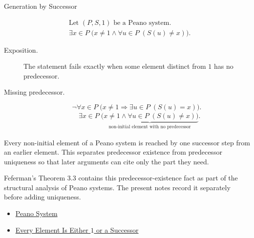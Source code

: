 \begin{topicbox}{Generation by Successor}
\begin{remark*}
\[
\begin{aligned}
&\text{Let } (P,S,1) \text{ be a Peano system.}\\
&\exists x \in P\;\bigl(x\neq 1 \land
\forall u \in P\;(S(u)\neq x)\bigr).
\end{aligned}
\]
\end{remark*}

\begin{remark*}
\begin{description}
  \item[Exposition.]
  The statement fails exactly when some element distinct from $1$ has no
  predecessor.
  \item[Missing predecessor.]
  \[
  \neg\forall x \in P\;\bigl(x\neq 1 \Longrightarrow
  \exists u \in P\;(S(u)=x)\bigr).
  \]
  \[
  \begin{aligned}
  &\exists x \in P\;
  \underbrace{\bigl(x\neq 1 \land
  \forall u \in P\;(S(u)\neq x)\bigr)}_{\text{non-initial element with no predecessor}}.
  \end{aligned}
  \]
\end{description}
\end{remark*}

\begin{remark*}[Interpretation]
Every non-initial element of a Peano system is reached by one successor step
from an earlier element. This separates predecessor existence from predecessor
uniqueness so that later arguments can cite only the part they need.
\end{remark*}

\begin{remark*}
Feferman's Theorem 3.3 contains this predecessor-existence fact as part of the
structural analysis of Peano systems. The present notes record it separately
before adding uniqueness. \citet{FefermanNumberSystems1964}
\end{remark*}

\begin{dependencies}
\begin{itemize}
  \item \hyperref[def:peano-system]{Peano System}
  \item \hyperref[thm:every-element-is-one-or-a-successor]{Every Element Is Either $1$ or a Successor}
\end{itemize}
\end{dependencies}


\end{topicbox}
